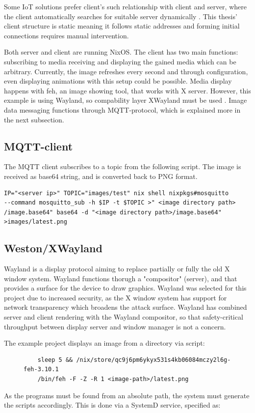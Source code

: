 Some IoT solutions prefer client's such relationship with client and
server, where the client automatically searches for suitable server
dynamically \cite{kandoi2021operating}. This thesis' client structure
is static meaning it follows static addresses and forming initial
connections requires manual intervention.

Both server and client are running NixOS. The client has two main
functions: subscribing to media receiving and displaying the gained
media which can be arbitrary. Currently, the image refreshes every
second and through configuration, even displaying
animations with this setup could be possible. Media display happens
with feh, an image showing tool, that works with X server. However,
this example is using Wayland, so compability layer XWayland must be
used \cite{waylandWayland}. Image data messaging functions through
MQTT-protocol, which is explained more in the next subsection.

\subsection{MQTT-client}
The MQTT client subscribes to a topic from the following script. The
image is received as base64 string, and is converted back to PNG
format.
\begin{lstlisting}
IP="<server ip>" TOPIC="images/test" nix shell nixpkgs#mosquitto
--command mosquitto_sub -h $IP -t $TOPIC >" <image directory path>
/image.base64" base64 -d "<image directory path>/image.base64"
>images/latest.png
\end{lstlisting}
\subsection{Weston/XWayland}
Wayland is a display protocol aiming to replace partially or fully the
old X window system. Wayland functions thorugh a "compositor"
(server), and that provides a surface for the device to draw
graphics. Wayland was selected for this project due to increased
security, as the X window system has support for network transparency
which broadens the attack surface. Wayland has combined server and
client rendering with the Wayland compositor, so that safety-critical
throughput between display server and window manager is not a
concern. \cite{waylandWayland} %

The example project displays an image from a directory via script:
\begin{figure}[H]
\begin{lstlisting} 
    sleep 5 && /nix/store/qc9j6pm6ykyx531s4kb06084mczy2l6g-feh-3.10.1
    /bin/feh -F -Z -R 1 <image-path>/latest.png
\end{lstlisting}
\label{fehscript}
\end{figure}
As the programs must be found from an absolute path, the system must
generate the scripts accordingly. This is done via a SystemD service,
specified as:



